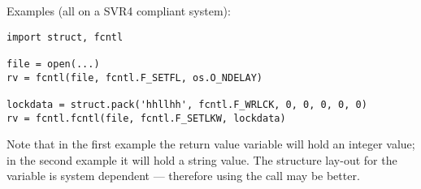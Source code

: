 Examples (all on a SVR4 compliant system):

\begin{verbatim}
import struct, fcntl

file = open(...)
rv = fcntl(file, fcntl.F_SETFL, os.O_NDELAY)

lockdata = struct.pack('hhllhh', fcntl.F_WRLCK, 0, 0, 0, 0, 0)
rv = fcntl.fcntl(file, fcntl.F_SETLKW, lockdata)
\end{verbatim}

Note that in the first example the return value variable  will
hold an integer value; in the second example it will hold a string
value.  The structure lay-out for the  variable is
system dependent --- therefore using the  call may be
better.

\begin{seealso}
\end{seealso}
